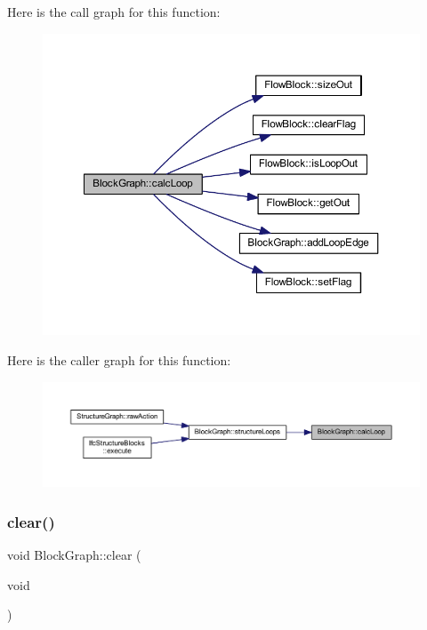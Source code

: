 Here is the call graph for this function\+:
\nopagebreak
\begin{figure}[H]
\begin{center}
\leavevmode
\includegraphics[width=350pt]{class_block_graph_aa65051f403ce79d384a76c4399cdad80_cgraph}
\end{center}
\end{figure}
Here is the caller graph for this function\+:
\nopagebreak
\begin{figure}[H]
\begin{center}
\leavevmode
\includegraphics[width=350pt]{class_block_graph_aa65051f403ce79d384a76c4399cdad80_icgraph}
\end{center}
\end{figure}
\mbox{\label{class_block_graph_a1220886c0c0cad9c8f482afe53dba5d4}} 
\subsubsection{\texorpdfstring{clear()}{clear()}}
{\footnotesize\ttfamily void Block\+Graph\+::clear (\begin{DoxyParamCaption}\item[{void}]{ }\end{DoxyParamCaption})}



